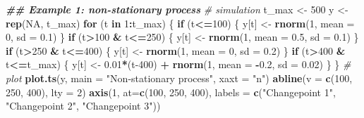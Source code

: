 \documentclass[
]{book}
\newenvironment{Shaded}{\begin{snugshade}}{\end{snugshade}}
\newcommand{\AttributeTok}[1]{\textcolor[rgb]{0.13,0.29,0.53}{#1}}
\newcommand{\CommentTok}[1]{\textcolor[rgb]{0.56,0.35,0.01}{\textit{#1}}}
\newcommand{\ConstantTok}[1]{\textcolor[rgb]{0.56,0.35,0.01}{#1}}
\newcommand{\ControlFlowTok}[1]{\textcolor[rgb]{0.13,0.29,0.53}{\textbf{#1}}}
\newcommand{\DecValTok}[1]{\textcolor[rgb]{0.00,0.00,0.81}{#1}}
\newcommand{\DocumentationTok}[1]{\textcolor[rgb]{0.56,0.35,0.01}{\textbf{\textit{#1}}}}
\newcommand{\FloatTok}[1]{\textcolor[rgb]{0.00,0.00,0.81}{#1}}
\newcommand{\FunctionTok}[1]{\textcolor[rgb]{0.13,0.29,0.53}{\textbf{#1}}}
\newcommand{\NormalTok}[1]{#1}
\newcommand{\OtherTok}[1]{\textcolor[rgb]{0.56,0.35,0.01}{#1}}
\newcommand{\SpecialCharTok}[1]{\textcolor[rgb]{0.81,0.36,0.00}{\textbf{#1}}}
\newcommand{\StringTok}[1]{\textcolor[rgb]{0.31,0.60,0.02}{#1}}
\begin{document}
\begin{Shaded}
\begin{Highlighting}[]
\DocumentationTok{\#\# Example 1: non{-}stationary process}
\CommentTok{\# simulation}
\NormalTok{t\_max }\OtherTok{\textless{}{-}} \DecValTok{500}
\NormalTok{y }\OtherTok{\textless{}{-}} \FunctionTok{rep}\NormalTok{(}\ConstantTok{NA}\NormalTok{, t\_max)}
\ControlFlowTok{for}\NormalTok{ (t }\ControlFlowTok{in} \DecValTok{1}\SpecialCharTok{:}\NormalTok{t\_max) \{}
  \ControlFlowTok{if}\NormalTok{ (t}\SpecialCharTok{\textless{}=}\DecValTok{100}\NormalTok{) \{}
\NormalTok{    y[t] }\OtherTok{\textless{}{-}} \FunctionTok{rnorm}\NormalTok{(}\DecValTok{1}\NormalTok{, }\AttributeTok{mean =} \DecValTok{0}\NormalTok{, }\AttributeTok{sd =} \FloatTok{0.1}\NormalTok{)}
\NormalTok{  \}}
  \ControlFlowTok{if}\NormalTok{ (t}\SpecialCharTok{\textgreater{}}\DecValTok{100} \SpecialCharTok{\&}\NormalTok{ t}\SpecialCharTok{\textless{}=}\DecValTok{250}\NormalTok{) \{}
\NormalTok{    y[t] }\OtherTok{\textless{}{-}} \FunctionTok{rnorm}\NormalTok{(}\DecValTok{1}\NormalTok{, }\AttributeTok{mean =} \FloatTok{0.5}\NormalTok{, }\AttributeTok{sd =} \FloatTok{0.1}\NormalTok{)}
\NormalTok{  \}}
  \ControlFlowTok{if}\NormalTok{ (t}\SpecialCharTok{\textgreater{}}\DecValTok{250} \SpecialCharTok{\&}\NormalTok{ t}\SpecialCharTok{\textless{}=}\DecValTok{400}\NormalTok{) \{}
\NormalTok{    y[t] }\OtherTok{\textless{}{-}} \FunctionTok{rnorm}\NormalTok{(}\DecValTok{1}\NormalTok{, }\AttributeTok{mean =} \DecValTok{0}\NormalTok{, }\AttributeTok{sd =} \FloatTok{0.2}\NormalTok{)}
\NormalTok{  \}}
  \ControlFlowTok{if}\NormalTok{ (t}\SpecialCharTok{\textgreater{}}\DecValTok{400} \SpecialCharTok{\&}\NormalTok{ t}\SpecialCharTok{\textless{}=}\NormalTok{t\_max) \{}
\NormalTok{    y[t] }\OtherTok{\textless{}{-}} \FloatTok{0.01}\SpecialCharTok{*}\NormalTok{(t}\DecValTok{{-}400}\NormalTok{) }\SpecialCharTok{+} \FunctionTok{rnorm}\NormalTok{(}\DecValTok{1}\NormalTok{, }\AttributeTok{mean =} \SpecialCharTok{{-}}\FloatTok{0.2}\NormalTok{, }\AttributeTok{sd =} \FloatTok{0.02}\NormalTok{)}
\NormalTok{  \}}
\NormalTok{\}}
\CommentTok{\# plot}
\FunctionTok{plot.ts}\NormalTok{(y, }\AttributeTok{main =} \StringTok{"Non{-}stationary process"}\NormalTok{, }\AttributeTok{xaxt =} \StringTok{"n"}\NormalTok{)}
\FunctionTok{abline}\NormalTok{(}\AttributeTok{v =} \FunctionTok{c}\NormalTok{(}\DecValTok{100}\NormalTok{, }\DecValTok{250}\NormalTok{, }\DecValTok{400}\NormalTok{), }\AttributeTok{lty =} \DecValTok{2}\NormalTok{)}
\FunctionTok{axis}\NormalTok{(}\DecValTok{1}\NormalTok{, }\AttributeTok{at=}\FunctionTok{c}\NormalTok{(}\DecValTok{100}\NormalTok{, }\DecValTok{250}\NormalTok{, }\DecValTok{400}\NormalTok{),}
     \AttributeTok{labels =} \FunctionTok{c}\NormalTok{(}\StringTok{"Changepoint 1"}\NormalTok{, }\StringTok{"Changepoint 2"}\NormalTok{, }\StringTok{"Changepoint 3"}\NormalTok{))}
\end{Highlighting}
\end{Shaded}
\end{document}
